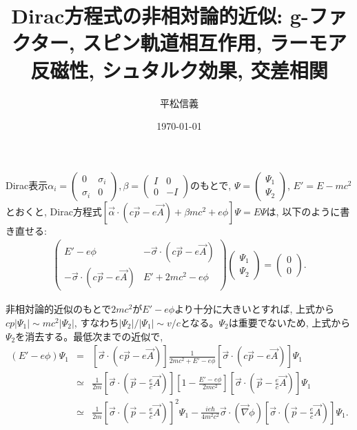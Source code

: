 \documentclass[11pt,a4paper]{jsarticle}
\title{Dirac方程式の非相対論的近似: g-ファクター, スピン軌道相互作用, ラーモア反磁性, シュタルク効果, 交差相関}
\author{平松信義}
\date{\today}
\begin{document}
\maketitle

Dirac表示$\alpha_i=\left( \begin{array}{cc}  0 & \sigma_i \\ \sigma_i & 0 \end{array} \right), \beta=\left( \begin{array}{cc}  I &0 \\ 0& -I \end{array} \right)$のもとで, $\Psi= \left( \begin{array}{c} \Psi_1 \\ \Psi_2 \end{array} \right)$, $E'=E-mc^2$とおくと, 
Dirac方程式$[\vec{\alpha}\cdot(c\vec{p}-e\vec{A})+\beta mc^2 + e\phi] \Psi = E \Psi$は, 以下のように書き直せる:
\begin{eqnarray}
\left( \begin{array}{cc}  E'-e\phi &  - \vec{\sigma}\cdot(c\vec{p}-e\vec{A})\\ -\vec{\sigma}\cdot(c\vec{p}-e\vec{A}) & E'+2mc^2-e\phi \end{array} \right)
\left( \begin{array}{c} \Psi_1 \\ \Psi_2 \end{array} \right)
=\left( \begin{array}{c} 0 \\ 0 \end{array} \right).
\end{eqnarray}

非相対論的近似のもとで$2mc^2$が$E'-e\phi$より十分に大きいとすれば, 上式から$cp |\Psi_1| \sim mc^2 |\Psi_2|$, すなわち$ |\Psi_2|/|\Psi_1| \sim v/c$となる。$\Psi_2$は重要でないため, 上式から$\Psi_2$を消去する。最低次までの近似で, 
\begin{eqnarray}
(E'-e\phi) \Psi_1 &=& [\vec{\sigma}\cdot(c\vec{p}-e\vec{A})] \frac{1}{2mc^2+E'-e\phi } [\vec{\sigma}\cdot(c\vec{p}-e\vec{A})] \Psi_1 \nonumber\\
&\simeq& \frac{1}{2m}[\vec{\sigma}\cdot(\vec{p}-\frac{e}{c}\vec{A})][1-\frac{E'-e\phi}{2mc^2} ][\vec{\sigma}\cdot(\vec{p}-\frac{e}{c}\vec{A})] \Psi_1 \nonumber\\
&\simeq& \frac{1}{2m}[\vec{\sigma}\cdot(\vec{p}-\frac{e}{c}\vec{A})]^2 \Psi_1 -\frac{ie\hbar}{4m^2c^2} \vec{\sigma}\cdot(\vec{\nabla}\phi)[\vec{\sigma}\cdot(\vec{p}-\frac{e}{c}\vec{A})] \Psi_1 .
\end{eqnarray}
\end{document}
